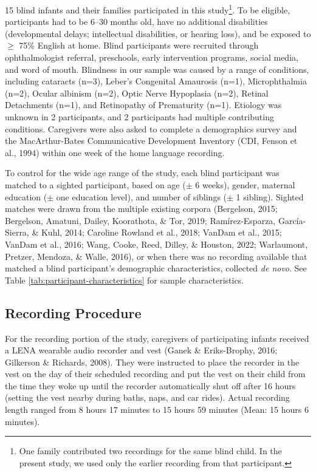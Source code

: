 \documentclass[
  man]{apa6}
\begin{document}
15 blind infants and their families participated in this study\footnote{One family contributed two recordings for the same blind child. In the present study, we used only the earlier recording from that participant.
}. To be eligible, participants had to be 6--30 months old, have no additional disabilities (developmental delays; intellectual disabilities, or hearing loss), and be exposed to \(\geq\) 75\% English at home. Blind participants were recruited through ophthalmologist referral, preschools, early intervention programs, social media, and word of mouth. Blindness in our sample was caused by a range of conditions, including cataracts (n=3), Leber's Congenital Amaurosis (n=1), Microphthalmia (n=2), Ocular albinism (n=2), Optic Nerve Hypoplasia (n=2), Retinal Detachments (n=1), and Retinopathy of Prematurity (n=1). Etiology was unknown in 2 participants, and 2 participants had multiple contributing conditions. Caregivers were also asked to complete a demographics survey and the MacArthur-Bates Communicative Development Inventory (CDI, Fenson et al., 1994) within one week of the home language recording.

To control for the wide age range of the study, each blind participant was matched to a sighted participant, based on age (\(\pm\) 6 weeks), gender, maternal education (\(\pm\) one education level), and number of siblings (\(\pm\) 1 sibling). Sighted matches were drawn from the multiple existing corpora (Bergelson, 2015; Bergelson, Amatuni, Dailey, Koorathota, \& Tor, 2019; Ramírez-Esparza, García-Sierra, \& Kuhl, 2014; Caroline Rowland et al., 2018; VanDam et al., 2015; VanDam et al., 2016; Wang, Cooke, Reed, Dilley, \& Houston, 2022; Warlaumont, Pretzer, Mendoza, \& Walle, 2016), or when there was no recording available that matched a blind participant's demographic characteristics, collected \emph{de novo}. See Table \ref{tab:participant-characteristics} for sample characteristics.

\hypertarget{recording-procedure}{%
\subsection{Recording Procedure}\label{recording-procedure}}

For the recording portion of the study, caregivers of participating infants received a LENA wearable audio recorder and vest (Ganek \& Eriks-Brophy, 2016; Gilkerson \& Richards, 2008). They were instructed to place the recorder in the vest on the day of their scheduled recording and put the vest on their child from the time they woke up until the recorder automatically shut off after 16 hours (setting the vest nearby during baths, naps, and car rides). Actual recording length ranged from 8 hours 17 minutes to 15 hours 59 minutes (Mean: 15 hours 6 minutes).
\end{document}
